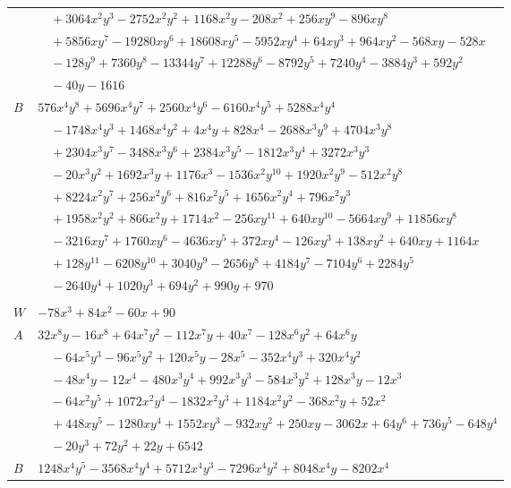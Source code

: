 \documentclass[11pt]{article}
\begin{document}
\begin{longtable}{@{}ll@{}}
 & $\quad +3064x^{2}y^{3}-2752x^{2}y^{2}+1168x^{2}y-208x^{2}+256xy^{9}-896xy^{8}$\\
 & $\quad +5856xy^{7}-19280xy^{6}+18608xy^{5}-5952xy^{4}+64xy^{3}+964xy^{2}-568xy-528x$\\
 & $\quad -128y^{9}+7360y^{8}-13344y^{7}+12288y^{6}-8792y^{5}+7240y^{4}-3884y^{3}+592y^{2}$\\
 & $\quad -40y-1616$\\
$B$ & $576x^{4}y^{8}+5696x^{4}y^{7}+2560x^{4}y^{6}-6160x^{4}y^{5}+5288x^{4}y^{4}$\\
 & $\quad -1748x^{4}y^{3}+1468x^{4}y^{2}+4x^{4}y+828x^{4}-2688x^{3}y^{9}+4704x^{3}y^{8}$\\
 & $\quad +2304x^{3}y^{7}-3488x^{3}y^{6}+2384x^{3}y^{5}-1812x^{3}y^{4}+3272x^{3}y^{3}$\\
 & $\quad -20x^{3}y^{2}+1692x^{3}y+1176x^{3}-1536x^{2}y^{10}+1920x^{2}y^{9}-512x^{2}y^{8}$\\
 & $\quad +8224x^{2}y^{7}+256x^{2}y^{6}+816x^{2}y^{5}+1656x^{2}y^{4}+796x^{2}y^{3}$\\
 & $\quad +1958x^{2}y^{2}+866x^{2}y+1714x^{2}-256xy^{11}+640xy^{10}-5664xy^{9}+11856xy^{8}$\\
 & $\quad -3216xy^{7}+1760xy^{6}-4636xy^{5}+372xy^{4}-126xy^{3}+138xy^{2}+640xy+1164x$\\
 & $\quad +128y^{11}-6208y^{10}+3040y^{9}-2656y^{8}+4184y^{7}-7104y^{6}+2284y^{5}$\\
 & $\quad -2640y^{4}+1020y^{3}+694y^{2}+990y+970$\\
\addlinespace[3pt]
\multicolumn{2}{@{}l}{$i=5$, $m=2$, neighbours $1,3,17,18,20,26,32,40$}\\
$W$ & $-78x^{3}+84x^{2}-60x+90$\\
$A$ & $32x^{8}y-16x^{8}+64x^{7}y^{2}-112x^{7}y+40x^{7}-128x^{6}y^{2}+64x^{6}y$\\
 & $\quad -64x^{5}y^{3}-96x^{5}y^{2}+120x^{5}y-28x^{5}-352x^{4}y^{3}+320x^{4}y^{2}$\\
 & $\quad -48x^{4}y-12x^{4}-480x^{3}y^{4}+992x^{3}y^{3}-584x^{3}y^{2}+128x^{3}y-12x^{3}$\\
 & $\quad -64x^{2}y^{5}+1072x^{2}y^{4}-1832x^{2}y^{3}+1184x^{2}y^{2}-368x^{2}y+52x^{2}$\\
 & $\quad +448xy^{5}-1280xy^{4}+1552xy^{3}-932xy^{2}+250xy-3062x+64y^{6}+736y^{5}-648y^{4}$\\
 & $\quad -20y^{3}+72y^{2}+22y+6542$\\
$B$ & $1248x^{4}y^{5}-3568x^{4}y^{4}+5712x^{4}y^{3}-7296x^{4}y^{2}+8048x^{4}y-8202x^{4}$\\

\end{longtable}
\end{document}
